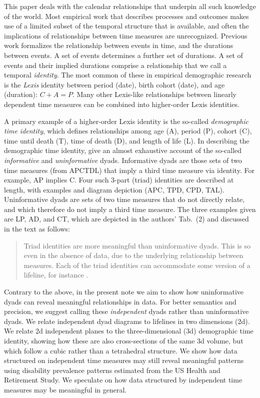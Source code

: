\documentclass{bmcart}
\begin{document}
This paper deals with the calendar relationships that underpin all such knowledge of the world. Most empirical work that describes processes and outcomes makes use of a limited subset of the temporal structure that is available, and often the implications of relationships between time measures are unrecognized. Previous work \citep{riffe2017demographictime} formalizes the relationship between events in time, and the durations between events. A set of events determines a further set of durations. A set of events and their implied durations comprise a relationship that we call a temporal \emph{identity}. The most common of these in empirical demographic research is the \emph{Lexis} identity between period (date), birth cohort (date), and age (duration): $C + A = P$. Many other Lexis-like relationships between linearly dependent time measures can be combined into higher-order Lexis identities. 

A primary example of a higher-order Lexis identity is the so-called \emph{demographic time identity}, which defines relationships among age (A), period (P), cohort (C), time until death (T), time of death (D), and length of life (L). In describing the demographic time identity, \citet{riffe2017demographictime} give an almost exhaustive account of the so-called \emph{informative} and \emph{uninformative} dyads. Informative dyads are those sets of two time measures (from APCTDL) that imply a third time measure via identity. For example, AP implies C. Four such 3-part (triad) identities are described at length, with examples and diagram depiction (APC, TPD, CPD, TAL). Uninformative dyads are sets of two time measures that do not directly relate, and which therefore do not imply a third time measure. The three examples given are LP, AD, and CT, which are depicted in the authors' Tab.~(2) and discussed in the text as follows:
\begin{quote}
Triad identities are more meaningful than uninformative dyads. This is so even in the absence of data, due to the underlying relationship between measures. Each of the triad identities can accommodate some version of a lifeline, for instance \citep[p5][]{riffe2017demographictime}. 
\end{quote}

Contrary to the above, in the present note we aim to show how uninformative dyads can reveal meaningful relationships in data. For better semantics and precision, we suggest calling these \emph{independent} dyads rather than uninformative dyads. We relate independent dyad diagrams to lifelines in two dimensions (2d). We relate 2d independent planes to the three-dimensional (3d) demographic time identity, showing how these are also cross-sections of the same 3d volume, but which follow a cubic rather than a tetrahedral structure. We show how data structured on independent time measures may still reveal meaningful patterns using disability prevalence patterns estimated from the US Health and Retirement Study. We speculate on how data structured by independent time measures may be meaningful in general.
\end{document}
